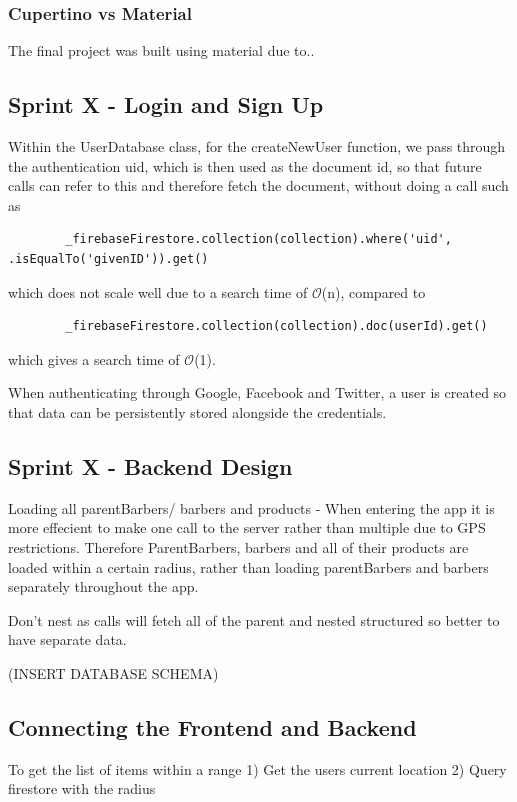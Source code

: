 \documentclass[12pt]{article}
\begin{document}
	\subsubsection{Cupertino vs Material}
	The final project was built using material due to..
	
	\subsection{Sprint X - Login and Sign Up}
	Within the UserDatabase class, for the createNewUser function, we pass through the authentication uid, which is then used as the document id, so that future calls can refer to this and therefore fetch the document, without doing a call such as 
	\begin{lstlisting}
		_firebaseFirestore.collection(collection).where('uid', .isEqualTo('givenID')).get()
	\end{lstlisting}
	which does not scale well due to a search time of $\mathcal{O}$(n), compared to 
	\begin{lstlisting}
		_firebaseFirestore.collection(collection).doc(userId).get()
	\end{lstlisting}
	which gives a search time of $\mathcal{O}$(1).
	
	When authenticating through Google, Facebook and Twitter, a user is created so that data can be persistently stored alongside the credentials.
	
	
	\subsection{Sprint X - Backend Design}
	
	Loading all parentBarbers/ barbers and products - 
	When entering the app it is more effecient to make one call to the server rather than multiple due to GPS restrictions. Therefore ParentBarbers, barbers and all of their products are loaded within a certain radius, rather than loading parentBarbers and barbers separately throughout the app. 
	
	Don't nest as calls will fetch all of the parent and nested structured so better to have separate data.
	
	(INSERT DATABASE SCHEMA)
	
	\subsection{Connecting the Frontend and Backend}
	To get the list of items within a range
	1) Get the users current location
	2) Query firestore with the radius
	
\end{document}
